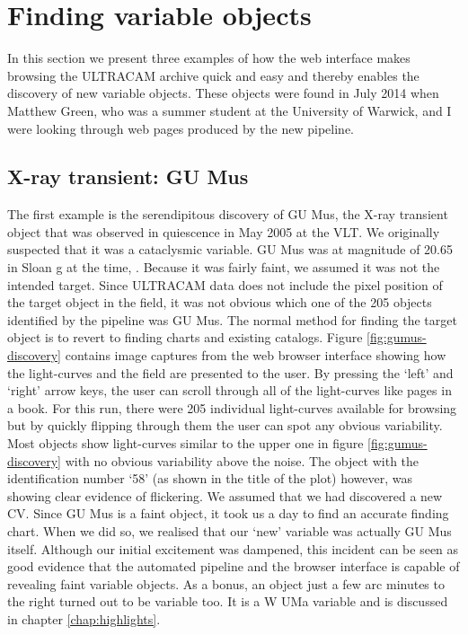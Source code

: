 \section{Finding variable objects}
In this section we present three examples of how the web interface makes browsing the ULTRACAM archive quick and easy and thereby enables the discovery of new variable objects. These objects were found in July 2014 when Matthew Green, who was a summer student at the University of Warwick, and I were looking through web pages produced by the new pipeline.

\subsection{X-ray transient: GU Mus}
The first example is the serendipitous discovery of {GU Mus}, the X-ray transient object that was observed in quiescence in May 2005 at the VLT. We originally suspected that it was a cataclysmic variable. {GU Mus} was at magnitude of 20.65 in Sloan g at the time, \citep{tariq2010}. Because it was fairly faint, we assumed it was not the intended target. Since ULTRACAM data does not include the pixel position of the target object in the field, it was not obvious which one of the 205 objects identified by the pipeline was {GU Mus}. The normal method for finding the target object is to revert to finding charts and existing catalogs. Figure \ref{fig:gumus-discovery} contains image captures from the web browser interface showing how the light-curves and the field are presented to the user. By pressing the `left' and `right' arrow keys, the user can scroll through all of the light-curves like pages in a book. For this run, there were 205 individual light-curves available for browsing but by quickly flipping through them the user can spot any obvious variability. Most objects show light-curves similar to the upper one in figure \ref{fig:gumus-discovery} with no obvious variability above the noise. The object with the identification number `58' (as shown in the title of the plot) however, was showing clear evidence of flickering. We assumed that we had discovered a new CV. Since {GU Mus} is a faint object, it took us a day to find an accurate finding chart. When we did so, we realised that our `new' variable was actually {GU Mus} itself. Although our initial excitement was dampened, this incident can be seen as good evidence that the automated pipeline and the browser interface is capable of revealing faint variable objects. As a bonus, an object just a few arc minutes to the right turned out to be variable too. It is a {W UMa} variable and is discussed in chapter \ref{chap:highlights}.

